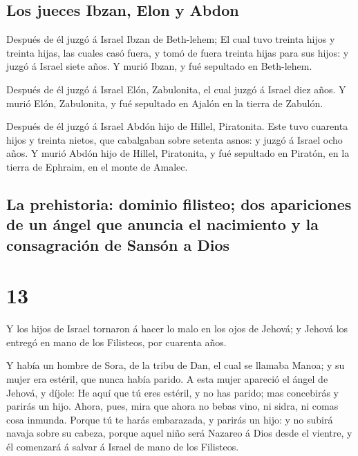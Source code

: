 \hypertarget{los-jueces-ibzan-elon-y-abdon}{%
\subsection{Los jueces Ibzan, Elon y
Abdon}\label{los-jueces-ibzan-elon-y-abdon}}

 Después de él juzgó á Israel Ibzan de Beth-lehem;
 El cual tuvo treinta hijos y treinta hijas, las cuales
casó fuera, y tomó de fuera treinta hijas para sus hijos: y juzgó á
Israel siete años.  Y murió Ibzan, y fué sepultado en
Beth-lehem.

 Después de él juzgó á Israel Elón, Zabulonita, el cual
juzgó á Israel diez años.  Y murió Elón, Zabulonita, y
fué sepultado en Ajalón en la tierra de Zabulón.

 Después de él juzgó á Israel Abdón hijo de Hillel,
Piratonita.  Este tuvo cuarenta hijos y treinta nietos,
que cabalgaban sobre setenta asnos: y juzgó á Israel ocho años.
 Y murió Abdón hijo de Hillel, Piratonita, y fué
sepultado en Piratón, en la tierra de Ephraim, en el monte de Amalec.

\hypertarget{la-prehistoria-dominio-filisteo-dos-apariciones-de-un-uxe1ngel-que-anuncia-el-nacimiento-y-la-consagraciuxf3n-de-sansuxf3n-a-dios}{%
\subsection{La prehistoria: dominio filisteo; dos apariciones de un
ángel que anuncia el nacimiento y la consagración de Sansón a
Dios}\label{la-prehistoria-dominio-filisteo-dos-apariciones-de-un-uxe1ngel-que-anuncia-el-nacimiento-y-la-consagraciuxf3n-de-sansuxf3n-a-dios}}

\hypertarget{section-12}{%
\section{13}\label{section-12}}

 Y los hijos de Israel tornaron á hacer lo malo en los
ojos de Jehová; y Jehová los entregó en mano de los Filisteos, por
cuarenta años.

 Y había un hombre de Sora, de la tribu de Dan, el cual se
llamaba Manoa; y su mujer era estéril, que nunca había parido.
 A esta mujer apareció el ángel de Jehová, y díjole: He
aquí que tú eres estéril, y no has parido; mas concebirás y parirás un
hijo.  Ahora, pues, mira que ahora no bebas vino, ni
sidra, ni comas cosa inmunda.  Porque tú te harás
embarazada, y parirás un hijo: y no subirá navaja sobre su cabeza,
porque aquel niño será Nazareo á Dios desde el vientre, y él comenzará á
salvar á Israel de mano de los Filisteos.

